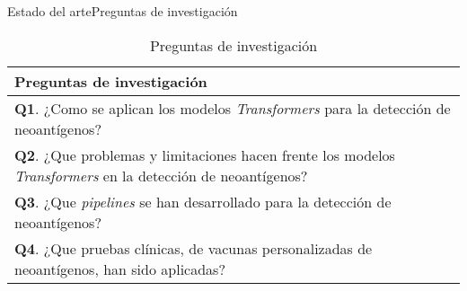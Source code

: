 \documentclass[10pt]{beamer}
\newcommand{\1}{
	\setbeamertemplate{background}{
		\texttt{[image: img/1]}
		\tikz[overlay] \fill[fill opacity=0.75,fill=white] (0,0) rectangle (-\paperwidth,\paperheight);
	}
}
\begin{document}
\begin{frame}{Estado del arte}{Preguntas de investigación}
	
	\begin{table}[h]
		\begin{center}
			\caption{Preguntas de investigación}
			\label{tab:questions}
			\setlength{\tabcolsep}{0.5em} %
			{\renewcommand{\arraystretch}{1.4}%
				\begin{tabular}{p{8.5cm}}
					\textbf{Preguntas de investigación} \\ \hline
					\textbf{Q1}. ¿Como se aplican los modelos \textit{Transformers} para la detección de neoantígenos? \\
					\textbf{Q2}. ¿Que problemas y limitaciones hacen frente los modelos \textit{Transformers} en la detección de neoantígenos? \\
					\textbf{Q3}.  ¿Que \textit{pipelines} se han desarrollado para la detección de neoantígenos? \\
					\textbf{Q4}.  ¿Que pruebas clínicas, de vacunas personalizadas de neoantígenos, han sido aplicadas? \\		
				\end{tabular}
			}
		\end{center}
	\end{table}
	
\end{frame}
\end{document}
